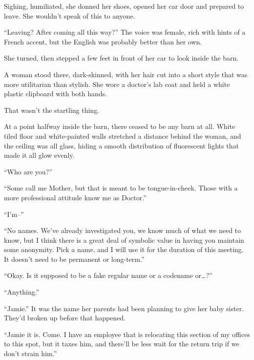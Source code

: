 Sighing, humiliated, she donned her shoes, opened her car door and prepared to leave.  She wouldn't speak of this to anyone.



``Leaving?  After coming all this way?''  The voice was female, rich with hints of a French accent, but the English was probably better than her own.



She turned, then stepped a few feet in front of her car to look inside the barn.



A woman stood there, dark-skinned, with her hair cut into a short style that was more utilitarian than stylish.  She wore a doctor's lab coat and held a white plastic clipboard with both hands.



That wasn't the startling thing.



At a point halfway inside the barn, there ceased to be any barn at all.  White tiled floor and white-painted walls stretched a distance behind the woman, and the ceiling was all glass, hiding a smooth distribution of fluorescent lights that made it all glow evenly.



``Who are you?''



``Some call me Mother, but that is meant to be tongue-in-cheek.  Those with a more professional attitude know me as Doctor.''



``I'm--''



``No names.  We've already investigated you, we know much of what we need to know, but I think there is a great deal of symbolic value in having you maintain some anonymity.  Pick a name, and I will use it for the duration of this meeting.  It doesn't need to be permanent or long-term.''



``Okay.  Is it supposed to be a fake regular name or a codename or\ldots?''



``Anything.''



``Jamie.''  It was the name her parents had been planning to give her baby sister.  They'd broken up before that happened.



``Jamie it is.  Come.  I have an employee that is relocating this section of my offices to this spot, but it taxes him, and there'll be less wait for the return trip if we don't strain him.''



